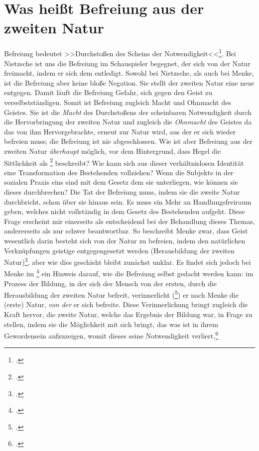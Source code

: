 \documentclass[12pt, a4paper, openany]{report}
\begin{document}
\section{Was heißt Befreiung aus der zweiten Natur}\label{abschnitt_3}
Befreiung bedeutet >>Durchstoßen des Scheins der Notwendigkeit<<\footcite[Vgl.][41]{menke_autonomie_2018}.
Bei Nietzsche ist uns die Befreiung im Schauspieler begegnet, der sich von der Natur freimacht, indem er sich dem  entledigt.
Sowohl bei Nietzsche, als auch bei Menke, ist die Befreiung aber keine bloße Negation. 
Sie stellt der  zweiten Natur eine neue entgegen.
Damit läuft die Befreiung Gefahr, sich gegen den Geist zu verselbstständigen. 
Somit ist Befreiung zugleich Macht und Ohnmacht des Geistes.
Sie ist die \emph{Macht} des Durchstoßens der scheinbaren Notwendigkeit durch die Hervorbringung der zweiten Natur und zugleich die \emph{Ohnmacht} des Geistes da das von ihm Hervorgebrachte, erneut zur Natur wird, aus der er sich wieder befreien muss; die Befreiung ist nie abgeschlossen.
Wie ist aber Befreiung aus der zweiten Natur \emph{überhaupt} möglich, vor dem Hintergrund, dass Hegel die Sittlichkeit als \footcite[][§ 147 (Anmerkung), S. 163]{hegel_grundlinien_2017} beschreibt?
Wie kann sich aus dieser verhältnislosen Identität eine Transformation des Bestehenden vollziehen?
Wenn die Subjekte in der sozialen Praxis eins sind mit dem Gesetz dem sie unterliegen, wie können sie dieses durchbrechen? 
Die Tat der Befreiung muss, indem sie die zweite Natur durchbricht, schon über sie hinaus sein.
Es muss ein Mehr an Handlungsfreiraum geben, welches nicht vollständig in dem Gesetz des Bestehenden aufgeht.
Diese Frage erscheint mir einerseits als entscheidend bei der Behandlung dieses Themas, andererseits als nur schwer beantwortbar.
So beschreibt Menke zwar, dass Geist wesentlich darin besteht sich von der Natur zu befreien, indem den natürlichen Verknüpfungen geistige entgegengesetzt werden (Herausbildung der zweiten Natur)\footcite[Vgl.][39]{menke_autonomie_2018}, aber wie dies geschieht bleibt zunächst unklar. 
Es findet sich jedoch bei Menke im \footcite[][51]{menke_autonomie_2018} ein Hinweis darauf, wie die Befreiung selbst gedacht werden kann:
im Prozess der Bildung, in der sich der Mensch von der ersten, durch die Herausbildung der zweiten Natur befreit, verinnerlicht (\footcite[][80]{menke_autonomie_2018}) er nach Menke die (erste) Natur, \emph{von der} er sich befreite.
Diese Verinnerlichung bringt zugleich die Kraft hervor, die zweite Natur, welche das Ergebnis der Bildung war, in Frage zu stellen, indem sie die Möglichkeit mit sich bringt, das was ist in ihrem Gewordensein aufzuzeigen, womit dieses seine Notwendigkeit verliert.\footcite[Vgl.][80]{menke_autonomie_2018}
\end{document}
